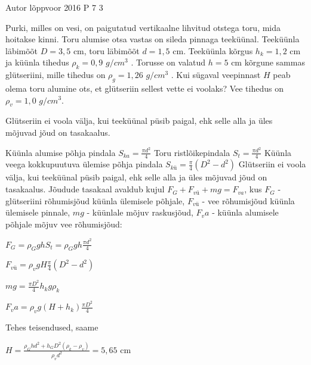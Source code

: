 {Autor} %
{lõppvoor} %
{2016} %
{P 7} %
{3} %
{

\ifStatement
Purki, milles on vesi, on paigutatud vertikaalne lihvitud otstega toru, mida hoitakse kinni. Toru alumise otsa vastas on sileda pinnaga teeküünal. Teeküünla läbimõõt $D = 3,5$ cm, toru läbimõõt $d = 1,5$ cm. Teeküünla kõrgus $h_k = 1,2$ cm ja küünla tihedus $\rho_k = 0,9$ $g/cm^3$ . Torusse on valatud $h = 5$ cm kõrgune sammas glütseriini, mille tihedus on $\rho_g = 1,26$ $g/cm^3$ . Kui sügaval veepinnast $H$ peab olema toru alumine ots, et glütseriin sellest vette ei voolaks? Vee tihedus on $\rho_v = 1,0$ $g/cm^3$.
\fi

\ifHint
Glütseriin ei voola välja, kui teeküünal püsib paigal, ehk selle alla ja üles mõjuvad jõud on tasakaalus.
\fi

\ifSolution
Küünla alumise põhja pindala $S_{ka} = \frac{\pi d^2}{4}$
\newline
Toru ristlõikepindala $S_t = \frac{\pi d^2}{4}$
\newline
Küünla veega kokkupuutuva ülemise põhja pindala $S_{kü} = \frac{\pi}{4}(D^2 - d^2)$
\newline
Glütseriin ei voola välja, kui teeküünal püsib paigal, ehk selle alla ja üles mõjuvad jõud on tasakaalus. Jõudude tasakaal avaldub kujul $F_G + F_{vü} + mg = F_{va}$,
\newline
kus $F_G$ - glütseriini rõhumisjõud küünla ülemisele põhjale,
\newline
$F_{vü}$ - vee rõhumisjõud küünla ülemisele pinnale,
\newline
$mg$ - küünlale mõjuv raskusjõud,
\newline
$F_va$ - küünla alumisele põhjale mõjuv vee rõhumisjõud:
\begin{center}
$F_G = \rho_G g h S_t = \rho_G g h \frac{\pi d^2}{4}$
\end{center}
\begin{center}
$F_{vü} = \rho_v g H \frac{\pi}{4}(D^2 - d^2)$
\end{center}
\begin{center}
$mg = \frac{\pi D^2}{4}h_k g \rho_k$
\end{center}
\begin{center}
$F_va = \rho_v g (H + h_k)\frac{\pi D^2}{4}$
\end{center}
Tehes teisendused, saame 
\begin{center}
$H = \frac{\rho_{G} h d^2 + h_G D^2 (\rho_k - \rho_v)}{\rho_v d^2} = 5,65$ cm
\end{center}
\fi
}